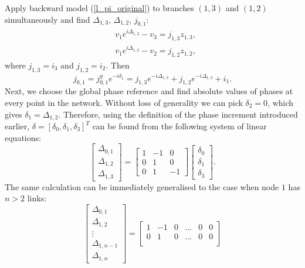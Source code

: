 \documentclass[journal,10pt,onecolumn,draftclsnofoot,]{IEEEtran}
\makeatletter
\theoremstyle{plain}
\theoremstyle{definition}
\theoremstyle{remark}
\renewenvironment{proof}[1][\proofname]{\par
  \pushQED{\qed}%
  \normalfont \topsep6\p@\@plus6\p@\relax
  \list{}{%
    \settowidth{\leftmargin}{\itshape\proofname:\hskip\labelsep}%
    \setlength{\labelwidth}{0pt}%
    \setlength{\itemindent}{-\leftmargin}%
  }%
  \item[\hskip\labelsep\itshape#1\@addpunct{:}]\ignorespaces
}{%
  \popQED\endlist\@endpefalse
}
\makeatother
\begin{document}
\begin{proof}[Proof (Outline)]
  Apply backward model (\ref{l_pi_original}) to branches $(1, 3)$ and $(1, 2)$ simultaneously and find $\Delta_{1,3}$, $\Delta_{1,2}$, $j_{0, 1}$:
  \begin{equation}
    \begin{split}
      &{} v_{1}e^{i\Delta_{1,3}} - v_{3} = j_{1,3}z_{1,3}, \\
      & v_{1}e^{i\Delta_{1,2}} - v_{2} = j_{1,2}z_{1,2},
    \end{split}
  \end{equation}
  where $j_{1,3} = i_3$ and $j_{1,2} = i_2$. Then 
  $$j_{0, 1} = j_{0, 1}^ge^{-i\delta_{1}} = j_{1,3}e^{-i\Delta_{1,3}} + j_{1,2}e^{-i\Delta_{1,2}} + i_1.$$
  Next, we choose the global phase reference and find absolute values of phases at every point in the network. Without loss of generality we can pick $\delta_2 = 0$, which gives $\delta_1 = \Delta_{1,2}$. Therefore, using the definition of the phase increment introduced earlier, $\delta = [\delta_0, \delta_1, \delta_3]^T$ can be found from the following system of linear equations:
  \begin{equation*}
  \begin{bmatrix}
  \Delta_{0,1} \\
  \Delta_{1,2} \\
  \Delta_{1,3}
  \end{bmatrix} = 
  \begin{bmatrix}
  1 & -1 & 0 \\
  0 & 1 & 0 \\
  0 & 1 & -1  
  \end{bmatrix}
  \begin{bmatrix}
  \delta_{0} \\
  \delta_{1} \\
  \delta_{3} 
  \end{bmatrix}.
  \end{equation*}
  The same calculation can be immediately generalised to the case when node $1$ has $n > 2$ links:
  \begin{equation*}
  \begin{bmatrix}
  \Delta_{0,1} \\
  \Delta_{1,2} \\
  \vdots \\
  \Delta_{1,n-1} \\
  \Delta_{1,n}
  \end{bmatrix} = 
  \begin{bmatrix}
  1 & -1 & 0 & \ldots & 0 & 0 \\
  0 & 1 & 0 & \ldots & 0 & 0 \\

\end{bmatrix}
\end{equation*}
\end{proof}
\end{document}
